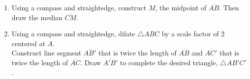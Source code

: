 \begin{enumerate}
\newpage
\item Using a compass and straightedge, construct $M$, the midpoint of $\overline{AB}$. Then draw the median $\overline{CM}$.
\vspace{2cm}
  \begin{center}
\end{center} \vspace{2cm}

\item Using a compass and straightedge, dilate $\triangle ABC$ by a scale factor of 2 centered at $A$.\\[0.25cm] Construct line segment $\overline{AB'}$ that is twice the length of $\overline{AB}$ and $\overline{AC'}$ that is twice the length of $\overline{AC}$. Draw $\overline{A'B'}$ to complete the desired triangle, $\triangle AB'C'$. \vspace{2cm}
  \begin{center}
\end{center}


\end{enumerate}



